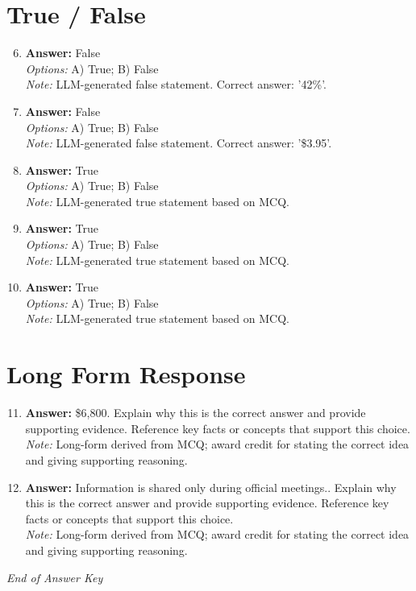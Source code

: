 \documentclass[12pt]{article}
\begin{document}
\section*{True / False}
\begin{enumerate}[label=\arabic*.]
\setcounter{enumi}{5}
\item \textbf{Answer:} False
\\ \textit{Options:} A) True; B) False
\\ \textit{Note:} LLM-generated false statement. Correct answer: '42\%'.
\item \textbf{Answer:} False
\\ \textit{Options:} A) True; B) False
\\ \textit{Note:} LLM-generated false statement. Correct answer: '\$3.95'.
\item \textbf{Answer:} True
\\ \textit{Options:} A) True; B) False
\\ \textit{Note:} LLM-generated true statement based on MCQ.
\item \textbf{Answer:} True
\\ \textit{Options:} A) True; B) False
\\ \textit{Note:} LLM-generated true statement based on MCQ.
\item \textbf{Answer:} True
\\ \textit{Options:} A) True; B) False
\\ \textit{Note:} LLM-generated true statement based on MCQ.
\end{enumerate}

\section*{Long Form Response}
\begin{enumerate}[label=\arabic*.]
\setcounter{enumi}{10}
\item \textbf{Answer:} \$6,800. Explain why this is the correct answer and provide supporting evidence. Reference key facts or concepts that support this choice.
\\ \textit{Note:} Long-form derived from MCQ; award credit for stating the correct idea and giving supporting reasoning.
\item \textbf{Answer:} Information is shared only during official meetings.. Explain why this is the correct answer and provide supporting evidence. Reference key facts or concepts that support this choice.
\\ \textit{Note:} Long-form derived from MCQ; award credit for stating the correct idea and giving supporting reasoning.
\end{enumerate}

\vfill
\noindent\textit{End of Answer Key}
\end{document}
